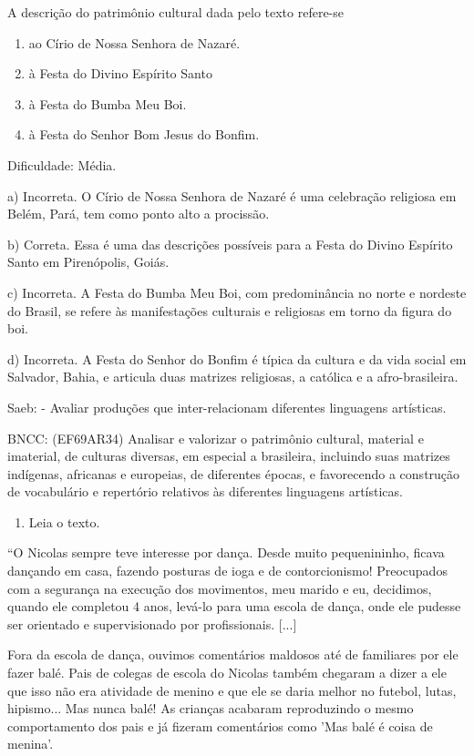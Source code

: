 \begin{escolha}
{{{{{{{{A descrição do patrimônio cultural dada pelo texto refere-se

\begin{enumerate}
\def\labelenumi{\alph{enumi})}
\item
  ao Círio de Nossa Senhora de Nazaré.
\item
  à Festa do Divino Espírito Santo
\item
  à Festa do Bumba Meu Boi.
\item
  à Festa do Senhor Bom Jesus do Bonfim.
\end{enumerate}

Dificuldade: Média.

a) Incorreta. O Círio de Nossa Senhora de Nazaré é uma celebração
religiosa em Belém, Pará, tem como ponto alto a procissão.

b) Correta. Essa é uma das descrições possíveis para a Festa do Divino
Espírito Santo em Pirenópolis, Goiás.

c) Incorreta. A Festa do Bumba Meu Boi, com predominância no norte e
nordeste do Brasil, se refere às manifestações culturais e religiosas em
torno da figura do boi.

d) Incorreta. A Festa do Senhor do Bonfim é típica da cultura e da vida
social em Salvador, Bahia, e articula duas matrizes religiosas, a
católica e a afro-brasileira.

Saeb: - Avaliar produções que inter-relacionam diferentes linguagens
artísticas.

BNCC: (EF69AR34) Analisar e valorizar o patrimônio cultural, material e
imaterial, de culturas diversas, em especial a brasileira, incluindo
suas matrizes indígenas, africanas e europeias, de diferentes épocas, e
favorecendo a construção de vocabulário e repertório relativos às
diferentes linguagens artísticas.

\begin{enumerate}
\def\labelenumi{\arabic{enumi}.}
\item
  Leia o texto.
\end{enumerate}

``O Nicolas sempre teve interesse por dança. Desde muito pequenininho,
ficava dançando em casa, fazendo posturas de ioga e de contorcionismo!
Preocupados com a segurança na execução dos movimentos, meu marido e eu,
decidimos, quando ele completou 4 anos, levá-lo para uma escola de
dança, onde ele pudesse ser orientado e supervisionado por
profissionais. {[}...{]}

Fora da escola de dança, ouvimos comentários maldosos até de familiares
por ele fazer balé. Pais de colegas de escola do Nicolas também chegaram
a dizer a ele que isso não era atividade de menino e que ele se daria
melhor no futebol, lutas, hipismo... Mas nunca balé! As crianças
acabaram reproduzindo o mesmo comportamento dos pais e já fizeram
comentários como 'Mas balé é coisa de menina'.

}}}}}}}}
\end{escolha}
